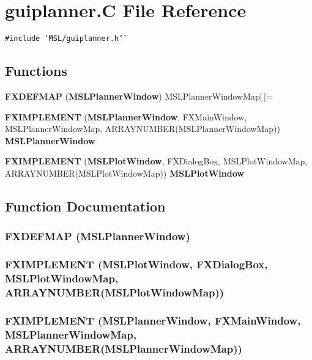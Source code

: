 \section{guiplanner.C File Reference}
\label{guiplanner_8C}
{\tt \#include \char`\"{}MSL/guiplanner.h\char`\"{}}\par
\subsection*{Functions}
\begin{CompactItemize}
\item 
{\bf FXDEFMAP} ({\bf MSLPlanner\-Window}) MSLPlanner\-Window\-Map[$\,$]=
\item 
{\bf FXIMPLEMENT} ({\bf MSLPlanner\-Window}, FXMain\-Window, MSLPlanner\-Window\-Map, ARRAYNUMBER(MSLPlanner\-Window\-Map)) {\bf MSLPlanner\-Window}
\item 
{\bf FXIMPLEMENT} ({\bf MSLPlot\-Window}, FXDialog\-Box, MSLPlot\-Window\-Map, ARRAYNUMBER(MSLPlot\-Window\-Map)) {\bf MSLPlot\-Window}
\end{CompactItemize}


\subsection{Function Documentation}
\subsubsection{\setlength{\rightskip}{0pt plus 5cm}FXDEFMAP ({\bf MSLPlanner\-Window})}\label{guiplanner_8C_a0}


\subsubsection{\setlength{\rightskip}{0pt plus 5cm}FXIMPLEMENT ({\bf MSLPlot\-Window}, FXDialog\-Box, MSLPlot\-Window\-Map, ARRAYNUMBER(MSLPlot\-Window\-Map))}\label{guiplanner_8C_a2}


\subsubsection{\setlength{\rightskip}{0pt plus 5cm}FXIMPLEMENT ({\bf MSLPlanner\-Window}, FXMain\-Window, MSLPlanner\-Window\-Map, ARRAYNUMBER(MSLPlanner\-Window\-Map))}\label{guiplanner_8C_a1}


